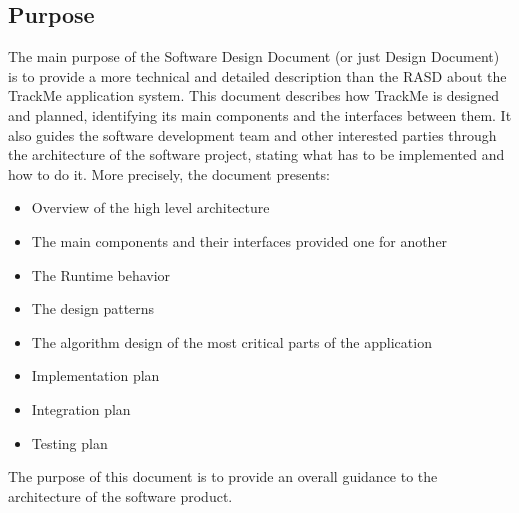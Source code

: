 \documentclass[12pt]{article}
\begin{document}
\subsection{Purpose}
The main purpose of the Software Design Document (or just Design Document) is to provide a more technical and detailed description than the RASD about the TrackMe application system. This document describes how TrackMe is designed and planned, identifying its main components and the interfaces between them. It also guides the software development team and other interested parties through the architecture of the software project, stating what has to be implemented and how to do it.
\vspace{3mm}
\newline 
More precisely, the document presents:
\begin{itemize}
    \item Overview of the high level architecture
    \item The main components and their interfaces provided one for another
    \item The Runtime behavior
    \item The design patterns
    \item The algorithm design of the most critical parts of the application
    \item Implementation plan
    \item Integration plan
    \item Testing plan
\end{itemize}
The purpose of this document is to provide an overall guidance to the architecture of the software product.
\end{document}
